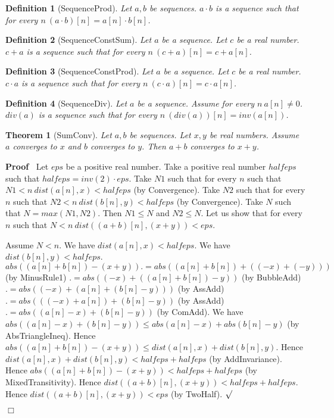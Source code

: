 \documentclass{article}
\newenvironment{forthel}{\begin{leftbar}}{\end{leftbar}}
\newenvironment{proof}{\noindent\textbf{Proof\ }}{\hspace*{\fill}$\Box$\medskip}
\newenvironment{subproof}{\begin{list}{}{}
		\item[\text{Proof}]}{\hfill $\surd$ \end{list}}
\newtheorem{theorem}{Theorem}
\newtheorem{definition}{Definition}
\newcommand{\cdotone}{\cdot}
\newcommand{\cdottwo}{\cdot}
\newcommand{\plusone}{+}
\newcommand{\plustwo}{+}
\begin{document}
\begin{forthel}
	\begin{definition}[SequenceProd]
	Let $a,b$ be sequences. $a \cdotone b$ is a sequence such that for every $n \ (a \cdotone b)[n] = a[n] \cdot b[n]$.
	\end{definition}
	
	\begin{definition}[SequenceConstSum]
	Let $a$ be a sequence. Let $c$ be a real number. $c \plustwo a$ is a sequence such that for every $n \ (c \plustwo a)[n] = c + a[n]$.
	\end{definition}
	
	\begin{definition}[SequenceConstProd]
	Let $a$ be a sequence. Let $c$ be a real number. $c \cdottwo a$ is a sequence such that for every $n \ (c \cdottwo a)[n] = c \cdot a[n]$.
	\end{definition}

	\begin{definition}[SequenceDiv]
	Let $a$ be a sequence. Assume for every $n \ a[n] \neq 0$. $div(a)$ is a sequence such that for every $n \ (div(a))[n] = inv(a[n])$.
	\end{definition}
	
	\begin{theorem}[SumConv]
	Let $a,b$ be sequences. Let $x,y$ be real numbers. Assume $a$ converges to $x$ and $b$ converges to $y$.
	Then $a \plusone b$ converges to $x + y$.
	\end{theorem}
	\begin{proof}
	Let $eps$ be a positive real number.
	Take a positive real number $halfeps$ such that $halfeps = inv(2) \cdot eps$.
	Take $N1$ such that for every $n$ such that $N1 < n \ dist(a[n],x) < halfeps$ (by Convergence).
	Take $N2$ such that for every $n$ such that $N2 < n \ dist(b[n],y) < halfeps$ (by Convergence).
	Take $N$ such that $N = max(N1,N2)$.
	Then $N1 \leq N$ and $N2 \leq N$.
	Let us show that for every $n$ such that $N < n \ dist((a \plusone b)[n],(x+y)) < eps$.
	\begin{subproof}
	Assume $N < n$.
	We have $dist(a[n],x) < halfeps$.
	We have $dist(b[n],y) < halfeps$.
	$abs((a[n] + b[n]) - (x + y)) .= abs((a[n] + b[n]) + ((-x) + (-y)))$ (by MinusRule1)
	$.= abs((-x) + ((a[n] + b[n]) - y))$ (by BubbleAdd)
	$.= abs((-x) + (a[n] + (b[n] - y)))$ (by AssAdd)
	$.= abs(((-x) + a[n]) + (b[n] - y))$ (by AssAdd)
	$.= abs((a[n] - x) + (b[n] - y))$ (by ComAdd).
	We have $abs((a[n] - x) + (b[n] - y)) \leq abs(a[n] - x) + abs(b[n] - y)$  (by AbsTriangleIneq).
	Hence $abs((a[n] + b[n]) - (x + y)) \leq dist(a[n],x) + dist(b[n],y)$.
	Hence $dist(a[n],x) + dist(b[n],y) < halfeps + halfeps$ (by AddInvariance).
	Hence $abs((a[n] + b[n]) - (x + y)) < halfeps + halfeps$ (by MixedTransitivity).
	Hence $dist((a \plusone b)[n],(x + y)) < halfeps + halfeps$.
	Hence $dist((a \plusone b)[n],(x + y)) < eps$ (by TwoHalf).
	\end{subproof}
	\end{proof}
	

\end{forthel}
\end{document}
